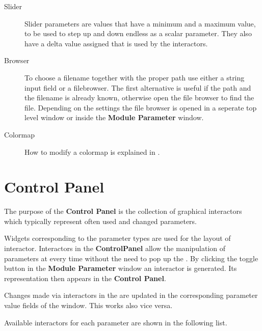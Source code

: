 \begin{itemize}
\begin{description}
	 \item[Slider]
	 Slider parameters are values that have a minimum and a maximum value, to be used to step up and down 
	 endless as a scalar parameter. They also have a delta value assigned that is used by the interactors.    
        
	 \item[Browser]
	 To choose a filename together with the proper path use either a string input field or 
	 a filebrowser. The first alternative is useful if the path and the 
	 filename is already known, otherwise open the file browser to find the file.	
    Depending on the settings the file browser 
    is opened in a seperate top level window or inside the {\bf Module Parameter} window.  
    
        
	 \item[Colormap]
	 How to modify a colormap is explained in {\mycolormap}.

    
	 \end{description}
	 \end{itemize}

   \clearpage
   
    
	 \section{Control Panel}
	 \label{control}

	 The purpose of the {\bf Control Panel} is the collection of graphical interactors which typically represent 
	 often used and changed parameters. 

    
	

	 Widgets corresponding to the parameter types are used for the layout of interactor. Interactors in the {\bf ControlPanel}  
	 allow the manipulation of parameters at every time without the need to 
	 pop up the {\myparameter}. By clicking the toggle button in the 
	 {\bf Module Parameter} window an interactor is generated. Its representation then appears in the 
	 {\bf Control Panel}.  

	 Changes made via interactors in the {\mycontrol} are updated in the 
	 corresponding parameter value fields of the {\myparameter} window.  This works also vice versa. 

	 Available interactors for each parameter are shown in the following list.

